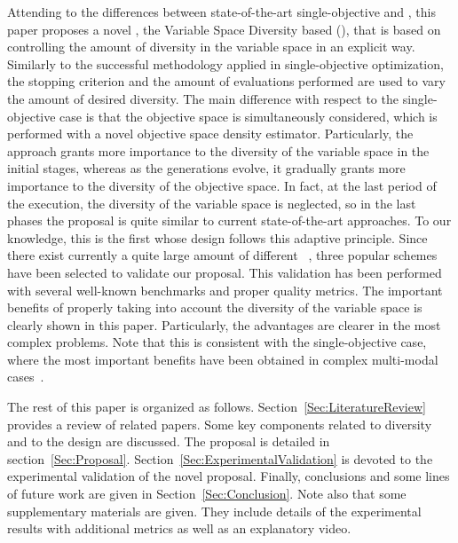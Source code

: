Attending to the differences between state-of-the-art single-objective \EAS{} and \MOEAS{}, 
this paper proposes a novel \MOEA{}, the Variable Space Diversity based \MOEA{} (\VSDMOEA{}), 
that is based on controlling the amount of diversity in the variable space in an explicit way.
%
Similarly to the successful methodology applied in single-objective optimization, the stopping criterion and the 
amount of evaluations performed are used to vary the amount of desired diversity.
%
The main difference with respect to the single-objective case is that the objective space is simultaneously considered, which
is performed with a novel objective space density estimator.
%
Particularly, the approach grants more importance to the diversity of the variable space in the initial stages, whereas 
as the generations evolve, it gradually grants more importance to the diversity of the objective space.
%
In fact, at the last period of the execution, the diversity of the variable space is neglected, so in the last phases the proposal 
is quite similar to current state-of-the-art approaches.
%
To our knowledge, this is the first \MOEA{} whose design follows this adaptive principle.
%
Since there exist currently a quite large amount of different \MOEAS{}~\cite{Joel:MOEA_APPLICATIONS_BOOK_KCTAN}, 
three popular schemes have been selected to validate our proposal.
%
%
%
%
%
This validation has been performed with several well-known benchmarks and proper quality metrics.
%
The important benefits of properly taking into account the diversity of the variable space is
clearly shown in this paper.
%
Particularly, the advantages are clearer in the most complex problems.
%
Note that this is consistent with the single-objective case, where the most important benefits have been obtained
in complex multi-modal cases~\cite{Segura:17}.

The rest of this paper is organized as follows. 
%
Section~\ref{Sec:LiteratureReview} provides a review of related papers.
%
Some key components related to diversity and to the \VSDMOEA{} design are discussed.
%
The \VSDMOEA{} proposal is detailed in section~\ref{Sec:Proposal}.
%
Section~\ref{Sec:ExperimentalValidation} is devoted to the experimental validation of the novel proposal.
%
Finally, conclusions and some lines of future work are given in Section~\ref{Sec:Conclusion}.
%
Note also that some supplementary materials are given.
%
They include details of the experimental results with additional metrics as well as an explanatory video.
